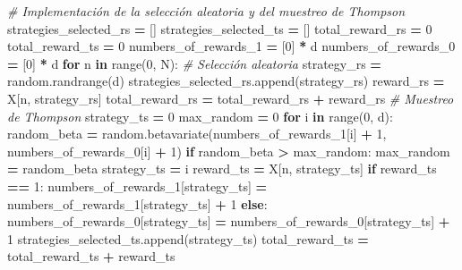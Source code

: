 \documentclass[]{book}
\newenvironment{Shaded}{\begin{snugshade}}{\end{snugshade}}
\newcommand{\BuiltInTok}[1]{#1}
\newcommand{\CommentTok}[1]{\textcolor[rgb]{0.56,0.35,0.01}{\textit{#1}}}
\newcommand{\ControlFlowTok}[1]{\textcolor[rgb]{0.13,0.29,0.53}{\textbf{#1}}}
\newcommand{\DecValTok}[1]{\textcolor[rgb]{0.00,0.00,0.81}{#1}}
\newcommand{\KeywordTok}[1]{\textcolor[rgb]{0.13,0.29,0.53}{\textbf{#1}}}
\newcommand{\NormalTok}[1]{#1}
\newcommand{\OperatorTok}[1]{\textcolor[rgb]{0.81,0.36,0.00}{\textbf{#1}}}
\begin{document}
\begin{Shaded}
\begin{Highlighting}[]
\CommentTok{# Implementación de la selección aleatoria y del muestreo de Thompson}
\NormalTok{strategies_selected_rs }\OperatorTok{=}\NormalTok{ []}
\NormalTok{strategies_selected_ts }\OperatorTok{=}\NormalTok{ []}
\NormalTok{total_reward_rs }\OperatorTok{=} \DecValTok{0}
\NormalTok{total_reward_ts }\OperatorTok{=} \DecValTok{0}
\NormalTok{numbers_of_rewards_1 }\OperatorTok{=}\NormalTok{ [}\DecValTok{0}\NormalTok{] }\OperatorTok{*}\NormalTok{ d}
\NormalTok{numbers_of_rewards_0 }\OperatorTok{=}\NormalTok{ [}\DecValTok{0}\NormalTok{] }\OperatorTok{*}\NormalTok{ d}
\ControlFlowTok{for}\NormalTok{ n }\KeywordTok{in} \BuiltInTok{range}\NormalTok{(}\DecValTok{0}\NormalTok{, N):}
    \CommentTok{# Selección aleatoria}
\NormalTok{    strategy_rs }\OperatorTok{=}\NormalTok{ random.randrange(d)}
\NormalTok{    strategies_selected_rs.append(strategy_rs)}
\NormalTok{    reward_rs }\OperatorTok{=}\NormalTok{ X[n, strategy_rs]}
\NormalTok{    total_reward_rs }\OperatorTok{=}\NormalTok{ total_reward_rs }\OperatorTok{+}\NormalTok{ reward_rs}
    \CommentTok{# Muestreo de Thompson}
\NormalTok{    strategy_ts }\OperatorTok{=} \DecValTok{0}
\NormalTok{    max_random }\OperatorTok{=} \DecValTok{0}
    \ControlFlowTok{for}\NormalTok{ i }\KeywordTok{in} \BuiltInTok{range}\NormalTok{(}\DecValTok{0}\NormalTok{, d):}
\NormalTok{        random_beta }\OperatorTok{=}\NormalTok{ random.betavariate(numbers_of_rewards_1[i] }\OperatorTok{+} \DecValTok{1}\NormalTok{,}
\NormalTok{                                         numbers_of_rewards_0[i] }\OperatorTok{+} \DecValTok{1}\NormalTok{)}
        \ControlFlowTok{if}\NormalTok{ random_beta }\OperatorTok{>}\NormalTok{ max_random:}
\NormalTok{            max_random }\OperatorTok{=}\NormalTok{ random_beta}
\NormalTok{            strategy_ts }\OperatorTok{=}\NormalTok{ i}
\NormalTok{    reward_ts }\OperatorTok{=}\NormalTok{ X[n, strategy_ts]}
    \ControlFlowTok{if}\NormalTok{ reward_ts }\OperatorTok{==} \DecValTok{1}\NormalTok{:}
\NormalTok{        numbers_of_rewards_1[strategy_ts] }\OperatorTok{=}\NormalTok{ numbers_of_rewards_1[strategy_ts] }\OperatorTok{+} \DecValTok{1}
    \ControlFlowTok{else}\NormalTok{:}
\NormalTok{        numbers_of_rewards_0[strategy_ts] }\OperatorTok{=}\NormalTok{ numbers_of_rewards_0[strategy_ts] }\OperatorTok{+} \DecValTok{1}
\NormalTok{    strategies_selected_ts.append(strategy_ts)}
\NormalTok{    total_reward_ts }\OperatorTok{=}\NormalTok{ total_reward_ts }\OperatorTok{+}\NormalTok{ reward_ts}
\end{Highlighting}
\end{Shaded}
\end{document}
